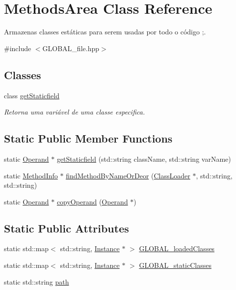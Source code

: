 \hypertarget{class_methods_area}{}\section{Methods\+Area Class Reference}
\label{class_methods_area}


Armazenas classes estáticas para serem usadas por todo o código ;.  




{\ttfamily \#include $<$G\+L\+O\+B\+A\+L\+\_\+file.\+hpp$>$}

\subsection*{Classes}
\begin{DoxyCompactItemize}
\item 
class \hyperlink{class_methods_area_1_1get_staticfield}{get\+Staticfield}
\begin{DoxyCompactList}\small\item\em Retorna uma variável de uma classe especifica. \end{DoxyCompactList}\end{DoxyCompactItemize}
\subsection*{Static Public Member Functions}
\begin{DoxyCompactItemize}
\item 
static \hyperlink{struct_operand}{Operand} $\ast$ \hyperlink{class_methods_area_adf2c71d678e710c5fd1c357737b07f5b}{get\+Staticfield} (std\+::string class\+Name, std\+::string var\+Name)
\item 
static \hyperlink{struct_method_info}{Method\+Info} $\ast$ \hyperlink{class_methods_area_ab8111f3fc9b55f1f8dbbbe0c1ca76d89}{find\+Method\+By\+Name\+Or\+Deor} (\hyperlink{class_class_loader}{Class\+Loader} $\ast$, std\+::string, std\+::string)
\item 
static \hyperlink{struct_operand}{Operand} $\ast$ \hyperlink{class_methods_area_ab4f4988ce71a130209877d841554b718}{copy\+Operand} (\hyperlink{struct_operand}{Operand} $\ast$)
\end{DoxyCompactItemize}
\subsection*{Static Public Attributes}
\begin{DoxyCompactItemize}
\item 
static std\+::map$<$ std\+::string, \hyperlink{struct_instance}{Instance} $\ast$ $>$ \hyperlink{class_methods_area_a210b48b3c45d8a2d981af099b6490438}{G\+L\+O\+B\+A\+L\+\_\+loaded\+Classes}
\item 
static std\+::map$<$ std\+::string, \hyperlink{struct_instance}{Instance} $\ast$ $>$ \hyperlink{class_methods_area_a34d779cc67f370a08cedc65245af2e7e}{G\+L\+O\+B\+A\+L\+\_\+static\+Classes}
\item 
static std\+::string \hyperlink{class_methods_area_af7210f4ca8ad442f7f9b83baa750b015}{path}
\end{DoxyCompactItemize}


